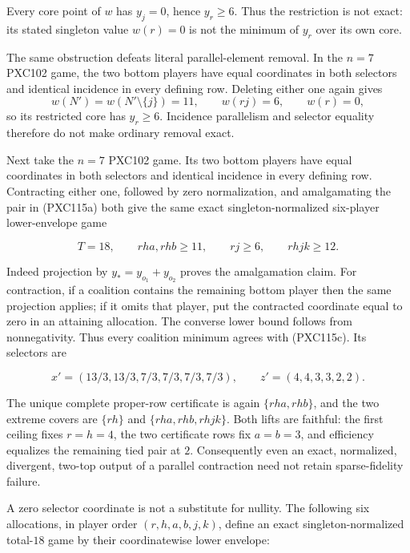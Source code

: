 \documentclass[11pt]{article}
\begin{document}
Every core point of \(w\) has \(y_j=0\), hence \(y_r\ge6\).  Thus the
restriction is not exact: its stated singleton value \(w(r)=0\) is not the
minimum of \(y_r\) over its own core.

The same obstruction defeats literal parallel-element removal.  In the
\(n=7\) PXC102 game, the two bottom players have equal coordinates in both
selectors and identical incidence in every defining row.  Deleting either
one again gives
\[
 w(N')=w(N'\setminus\{j\})=11,\qquad w(rj)=6,\qquad w(r)=0,
\]
so its restricted core has \(y_r\ge6\).  Incidence parallelism and selector
equality therefore do not make ordinary removal exact.

Next take the \(n=7\) PXC102 game.  Its two bottom players have equal
coordinates in both selectors and identical incidence in every defining
row.  Contracting either one, followed by zero normalization, and
amalgamating the pair in (PXC115a) both give the same exact
singleton-normalized six-player lower-envelope game


\begin{equation}
 T=18,\qquad rha,rhb\ge11,\qquad rj\ge6,\qquad rhjk\ge12. \tag{PXC115c}
\end{equation}

Indeed projection by \(y_*=y_{o_1}+y_{o_2}\) proves the amalgamation claim.
For contraction, if a coalition contains the remaining bottom player then
the same projection applies; if it omits that player, put the contracted
coordinate equal to zero in an attaining allocation.  The converse lower
bound follows from nonnegativity.  Thus every coalition minimum agrees with
(PXC115c).  Its selectors are


\begin{equation}
 x'=(13/3,13/3,7/3,7/3,7/3,7/3),\qquad
 z'=(4,4,3,3,2,2).                                         \tag{PXC115d}
\end{equation}

The unique complete proper-row certificate is again \(\{rha,rhb\}\), and
the two extreme covers are \(\{rh\}\) and \(\{rha,rhb,rhjk\}\).  Both lifts
are faithful: the first ceiling fixes \(r=h=4\), the two certificate rows
fix \(a=b=3\), and efficiency equalizes the remaining tied pair at \(2\).
Consequently even an exact, normalized, divergent, two-top output of a
parallel contraction need not retain sparse-fidelity failure.

A zero selector coordinate is not a substitute for nullity.  The following
six allocations, in player order \((r,h,a,b,j,k)\), define an exact
singleton-normalized total-\(18\) game by their coordinatewise lower envelope:
\end{document}
